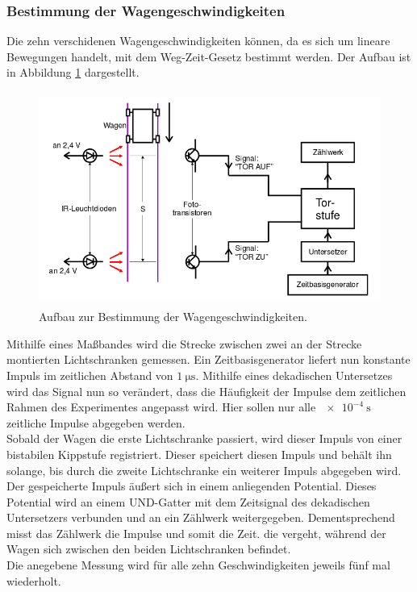 \subsubsection{Bestimmung der Wagengeschwindigkeiten}
\label{sec:d1}
Die zehn verschidenen Wagengeschwindigkeiten können, da es sich um lineare Bewegungen handelt, mit dem Weg-Zeit-Gesetz bestimmt werden.
Der Aufbau ist in Abbildung \ref{tfig:1} dargestellt.
\begin{figure}
  \centering
  \includegraphics[height=7cm]{aufbau1.png}
  \caption{Aufbau zur Bestimmung der Wagengeschwindigkeiten. \cite{sample}}
  \label{tfig:1}
\end{figure}
Mithilfe eines Maßbandes wird die Strecke zwischen zwei an der Strecke montierten Lichtschranken gemessen.
Ein Zeitbasisgenerator liefert nun konstante Impuls im zeitlichen Abstand von $\SI{1}{\micro\second}$.
Mithilfe eines dekadischen Untersetzes wird das Signal nun so verändert, dass die Häufigkeit der Impulse dem zeitlichen Rahmen des Experimentes angepasst wird.
Hier sollen nur alle $\SI{e-4}{\second}$ zeitliche Impulse abgegeben werden. \\
Sobald der Wagen die erste Lichtschranke passiert, wird dieser Impuls von einer bistabilen Kippstufe registriert.
Dieser speichert diesen Impuls und behält ihn solange, bis durch die zweite Lichtschranke ein weiterer Impuls abgegeben wird.
Der gespeicherte Impuls äußert sich in einem anliegenden Potential.
Dieses Potential wird an einem UND-Gatter mit dem Zeitsignal des dekadischen Untersetzers verbunden und an ein Zählwerk weitergegeben.
Dementsprechend misst das Zählwerk die Impulse und somit die Zeit. die vergeht, während der Wagen sich zwischen den beiden Lichtschranken befindet.\\
Die anegebene Messung wird für alle zehn Geschwindigkeiten jeweils fünf mal wiederholt.

